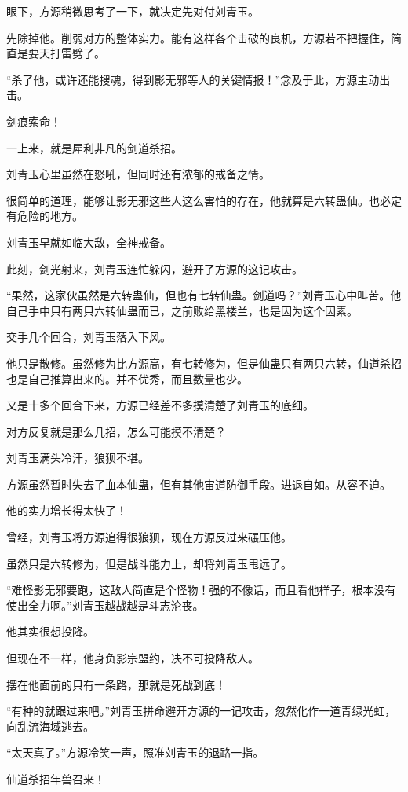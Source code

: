 \begin{this_body}
眼下，方源稍微思考了一下，就决定先对付刘青玉。

先除掉他。削弱对方的整体实力。能有这样各个击破的良机，方源若不把握住，简直是要天打雷劈了。

“杀了他，或许还能搜魂，得到影无邪等人的关键情报！”念及于此，方源主动出击。

剑痕索命！

一上来，就是犀利非凡的剑道杀招。

刘青玉心里虽然在怒吼，但同时还有浓郁的戒备之情。

很简单的道理，能够让影无邪这些人这么害怕的存在，他就算是六转蛊仙。也必定有危险的地方。

刘青玉早就如临大敌，全神戒备。

此刻，剑光射来，刘青玉连忙躲闪，避开了方源的这记攻击。

“果然，这家伙虽然是六转蛊仙，但也有七转仙蛊。剑道吗？”刘青玉心中叫苦。他自己手中只有两只六转仙蛊而已，之前败给黑楼兰，也是因为这个因素。

交手几个回合，刘青玉落入下风。

他只是散修。虽然修为比方源高，有七转修为，但是仙蛊只有两只六转，仙道杀招也是自己推算出来的。并不优秀，而且数量也少。

又是十多个回合下来，方源已经差不多摸清楚了刘青玉的底细。

对方反复就是那么几招，怎么可能摸不清楚？

刘青玉满头冷汗，狼狈不堪。

方源虽然暂时失去了血本仙蛊，但有其他宙道防御手段。进退自如。从容不迫。

他的实力增长得太快了！

曾经，刘青玉将方源追得很狼狈，现在方源反过来碾压他。

虽然只是六转修为，但是战斗能力上，却将刘青玉甩远了。

“难怪影无邪要跑，这敌人简直是个怪物！强的不像话，而且看他样子，根本没有使出全力啊。”刘青玉越战越是斗志沦丧。

他其实很想投降。

但现在不一样，他身负影宗盟约，决不可投降敌人。

摆在他面前的只有一条路，那就是死战到底！

“有种的就跟过来吧。”刘青玉拼命避开方源的一记攻击，忽然化作一道青绿光虹，向乱流海域逃去。

“太天真了。”方源冷笑一声，照准刘青玉的退路一指。

仙道杀招年兽召来！


\end{this_body}
